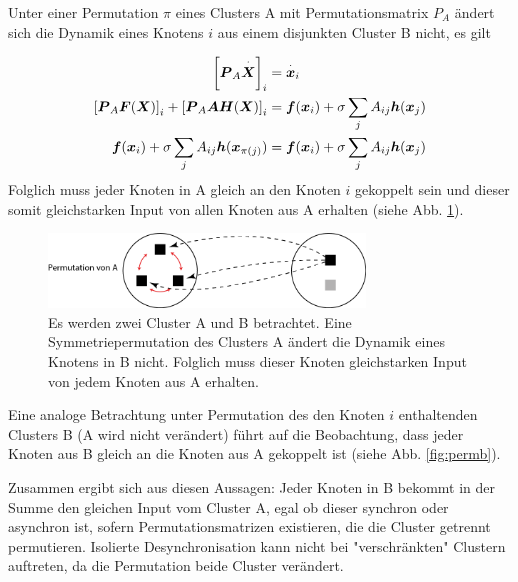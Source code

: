 Unter einer Permutation $\pi$ eines Clusters A mit Permutationsmatrix $P_A$ ändert sich die Dynamik eines Knotens $i$ aus einem disjunkten Cluster B nicht, es gilt



\begin{align}
		\notag \left[\boldsymbol{P}_A	\overset{\cdot}{\boldsymbol{X}}\right]_i&= \overset{\cdot}{\boldsymbol{x}}_i\\
		\notag\left[\boldsymbol{P}_A \boldsymbol{F}(\boldsymbol{X})\right]_i+
			\left[\boldsymbol{P}_A\boldsymbol{A}\boldsymbol{H}(\boldsymbol{X})\right]_i&=
			\boldsymbol{f}(\boldsymbol{x}_i)+
			\sigma\sum_j A_{ij}\boldsymbol{h}(\boldsymbol{x}_j)\\
		\boldsymbol{f}(\boldsymbol{x}_i)+
			\sigma\sum_j A_{ij}\boldsymbol{h}(\boldsymbol{x}_{\pi\left(j\right)})&=
		\boldsymbol{f}(\boldsymbol{x}_i)+
			\sigma\sum_j A_{ij}\boldsymbol{h}(\boldsymbol{x}_j)		
\end{align}
Folglich muss jeder Knoten in A gleich an den Knoten $i$ gekoppelt sein und dieser somit gleichstarken Input von allen Knoten aus A erhalten (siehe Abb. \ref{fig:perma}).

\begin{figure}
		\includegraphics[width=0.75\textwidth]{abb/misc/perm_a.png}
		\caption{Es werden zwei Cluster A und B betrachtet. Eine Symmetriepermutation des Clusters A ändert die Dynamik eines Knotens in B nicht. Folglich muss dieser Knoten gleichstarken Input von jedem Knoten aus A erhalten.}
		\label{fig:perma}
\end{figure}


Eine analoge Betrachtung  unter Permutation des den Knoten $i$ enthaltenden Clusters B (A wird nicht verändert) führt auf die Beobachtung, dass jeder Knoten aus B gleich an die Knoten aus A gekoppelt ist (siehe Abb. \ref{fig:permb}). 

Zusammen ergibt sich aus diesen Aussagen: Jeder Knoten in B bekommt in der Summe den gleichen Input vom Cluster A, egal ob dieser synchron oder asynchron ist, sofern Permutationsmatrizen existieren, die die Cluster getrennt permutieren. Isolierte Desynchronisation kann nicht bei "verschränkten" Clustern auftreten, da die Permutation beide Cluster verändert.


